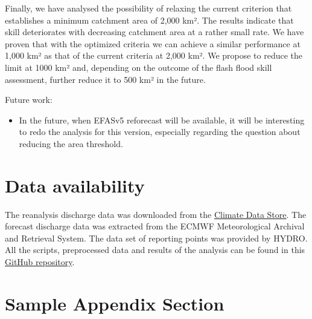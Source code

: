 \documentclass[preprint,12pt]{elsarticle}
\begin{document}
Finally, we have analysed the possibility of relaxing the current criterion that establishes a minimum catchment area of 2,000 km². The results indicate that skill deteriorates with decreasing catchment area at a rather small rate. We have proven that with the optimized criteria we can achieve a similar performance at 1,000 km² as that of the current criteria at 2,000 km². We propose to reduce the limit at 1000 km² and, depending on the outcome of the flash flood skill assessment, further reduce it to 500 km² in the future.

Future work:

\begin{itemize}
\item In the future, when EFASv5 reforecast will be available, it will be interesting to redo the analysis for this version, especially regarding the question about reducing the area threshold.
\end{itemize}

\section{Data availability}

The reanalysis discharge data was downloaded from the \href{https://cds.climate.copernicus.eu}{Climate Data Store}. The forecast discharge data was extracted from the ECMWF Meteorological Archival and Retrieval System. The data set of reporting points was provided by HYDRO. All the scripts, preprocessed data and results of the analysis can be found in this \href{https://github.com/casadoj/EFAS_skill}{GitHub repository}.

\appendix

\section{Sample Appendix Section}
\label{sec:sample:appendix}


  
 





\end{document}
